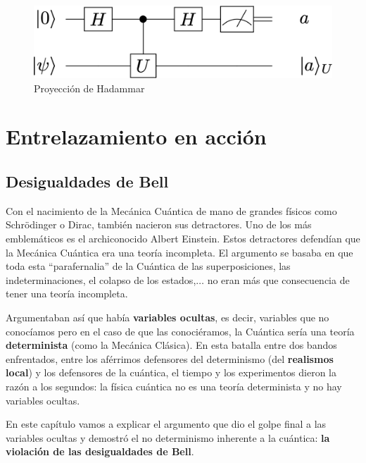 \documentclass[a4paper,11pt]{book} %
\numberwithin{equation}{chapter}
\begin{document}
	\begin{figure}[H]
	\centering 
	\includegraphics[width=0.4\linewidth]{Figuras/Fig_medidas2_HadamardProjection.png}
	\caption{Proyección de Hadammar}
	\label{Fig_medidas2_HadamardProjection}
	\end{figure}




















\chapter{Entrelazamiento en acción}

    \section{Desigualdades de Bell}

Con el nacimiento de la Mecánica Cuántica de mano de grandes físicos como Schrödinger o Dirac, también nacieron sus detractores. Uno de los más emblemáticos es el archiconocido Albert Einstein. Estos detractores defendían que la Mecánica Cuántica era una teoría incompleta. El argumento se basaba en que toda esta ``parafernalia'' de la Cuántica de las superposiciones, las indeterminaciones, el colapso de los estados,$\dots$ no eran más que consecuencia de tener una teoría incompleta. 

Argumentaban así que había \textbf{variables ocultas}, es decir, variables que no conocíamos pero en el caso de que las conociéramos, la Cuántica sería una teoría \textbf{determinista} (como la Mecánica Clásica). En esta batalla entre dos bandos enfrentados, entre los aférrimos defensores del determinismo (del \textbf{realismos local}) y los defensores de la cuántica, el tiempo y los experimentos dieron la razón a los segundos: la física cuántica no es una teoría determinista y no hay variables ocultas.

En este capítulo vamos a explicar el argumento que dio el golpe final a las variables ocultas y demostró el no determinismo inherente a la cuántica: \textbf{la violación de las desigualdades de Bell}.
\end{document}
